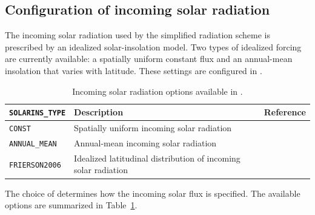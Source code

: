 \subsection{Configuration of incoming solar radiation}
\label{subsec:physics_rd_solar_radiation}

The incoming solar radiation used by the simplified radiation scheme is prescribed by an idealized solar-insolation model.
Two types of idealized forcing are currently available: a spatially uniform constant flux and an annual-mean insolation that varies with latitude.
These settings are configured in .

\begin{table}[htbp]
\caption{Incoming solar radiation options available in \scaledg.}
\label{tab:solarins_type_list}
\begin{center}
\begin{tabularx}{150mm}{lXX}
\hline
\rowcolor[gray]{0.9}
\verb|SOLARINS_TYPE| & Description & Reference \\
\hline
\verb|CONST|       & Spatially uniform incoming solar radiation             & \\
\verb|ANNUAL_MEAN| & Annual-mean incoming solar radiation                   & \\
\verb|FRIERSON2006| & Idealized latitudinal distribution of incoming solar radiation & \cite{Frierson2006} \\
\hline
\end{tabularx}
\end{center}
\end{table}
The choice of  determines how the incoming solar flux is specified.
The available options are summarized in Table~\ref{tab:solarins_type_list}.


